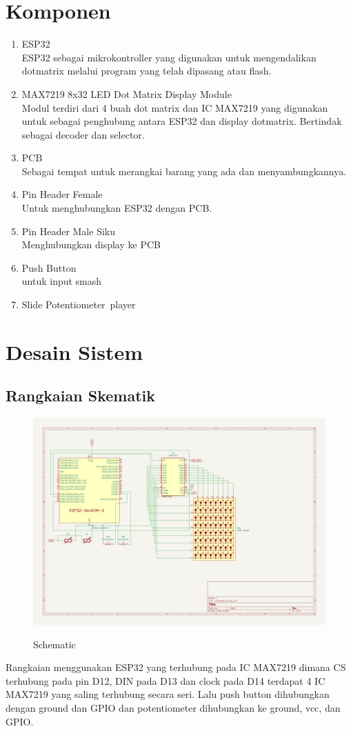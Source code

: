 \documentclass[a4paper,12pt]{article}
\begin{document}
\section{Komponen}
\begin{enumerate}
    \item ESP32\\
    ESP32 sebagai mikrokontroller yang digunakan untuk mengendalikan dotmatrix
    melalui program yang telah dipasang atau flash.
    \item MAX7219 8x32 LED Dot Matrix Display Module\\
    Modul terdiri dari 4 buah dot matrix dan IC MAX7219 yang digunakan untuk sebagai
    penghubung antara ESP32 dan display dotmatrix. Bertindak sebagai decoder dan selector.
    \item PCB\\
    Sebagai tempat untuk merangkai barang yang ada dan menyambungkannya.
    \item Pin Header Female\\
    Untuk menghubungkan ESP32 dengan PCB.
    \item Pin Header Male Siku\\
    Menghubungkan display ke PCB
    \item Push Button\\untuk input smash
    \item Slide Potentiometer\ player
\end{enumerate}

\section{Desain Sistem}
\subsection{Rangkaian Skematik}
\begin{figure}[H]
    \centering
    \includegraphics[width=1\textwidth]{images/schematic.png}
    \label{fig:schematic}
    \caption{Schematic}
\end{figure}
Rangkaian menggunakan ESP32 yang terhubung pada IC MAX7219 dimana CS
terhubung pada pin D12, DIN pada D13 dan clock pada D14
terdapat 4 IC MAX7219 yang saling terhubung secara seri. Lalu push button dihubungkan dengan
ground dan GPIO dan potentiometer dihubungkan ke ground, vcc, dan GPIO.
\end{document}
